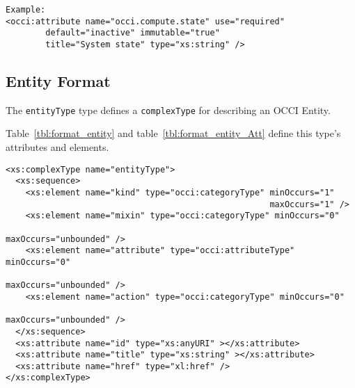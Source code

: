 \documentclass[10pt,a4paper]{article}
\begin{document}
\begin{lstlisting}
Example:
<occi:attribute name="occi.compute.state" use="required"
		default="inactive" immutable="true"
		title="System state" type="xs:string" />
\end{lstlisting}

\subsection{Entity Format}
\label{sec:format_entity}


The \texttt{entityType} type defines a \texttt{complexType} for
describing an OCCI Entity. 

Table~\ref{tbl:format_entity} and table~\ref{tbl:format_entity_Att}
define this type's attributes and elements.

\begin{lstlisting}
<xs:complexType name="entityType">
  <xs:sequence>
    <xs:element name="kind" type="occi:categoryType" minOccurs="1" 
                                                     maxOccurs="1" />
    <xs:element name="mixin" type="occi:categoryType" minOccurs="0" 
                                                      maxOccurs="unbounded" />
    <xs:element name="attribute" type="occi:attributeType" minOccurs="0" 
                                                           maxOccurs="unbounded" />
    <xs:element name="action" type="occi:categoryType" minOccurs="0" 
                                                       maxOccurs="unbounded" />
  </xs:sequence>
  <xs:attribute name="id" type="xs:anyURI" ></xs:attribute>
  <xs:attribute name="title" type="xs:string" ></xs:attribute>
  <xs:attribute name="href" type="xl:href" />
</xs:complexType>
\end{lstlisting}
\end{document}
